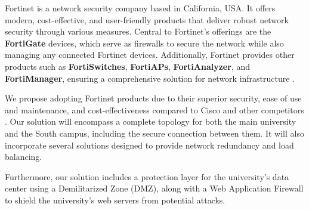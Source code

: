 \documentclass[12pt]{report}
\begin{document}
Fortinet is a network security company based in California, USA. It offers modern, cost-effective, and user-friendly products that deliver robust network security through various measures. Central to Fortinet’s offerings are the \textbf{FortiGate} devices, which serve as firewalls to secure the network while also managing any connected Fortinet devices. Additionally, Fortinet provides other products such as \textbf{FortiSwitches}, \textbf{FortiAPs}, \textbf{FortiAnalyzer}, and \textbf{FortiManager}, ensuring a comprehensive solution for network infrastructure \cite{FortinetAbtus}.

We propose adopting Fortinet products due to their superior security, ease of use and maintenance, and cost-effectiveness compared to Cisco and other competitors \cite{FNvsCISCO}. Our solution will encompass a complete topology for both the main university and the South campus, including the secure connection between them. It will also incorporate several solutions designed to provide network redundancy and load balancing.

Furthermore, our solution includes a protection layer for the university’s data center using a Demilitarized Zone (DMZ), along with a Web Application Firewall to shield the university’s web servers from potential attacks.
\end{document}
